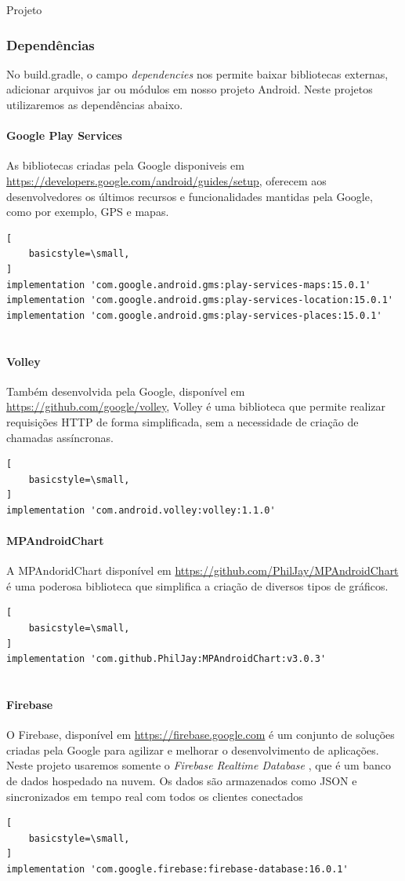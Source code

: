 \documentclass[
	12pt,				%
	openright,			%
	twoside,			%
	a4paper,			%
	english,			%
	french,				%
	spanish,			%
	brazil				%
	]{abntex2}
\begin{document}
\begin{chapter}{Projeto}
\subsubsection{Dependências}
 No build.gradle, o campo \textit{dependencies} nos permite baixar bibliotecas externas, adicionar arquivos jar ou módulos em nosso projeto Android. Neste projetos utilizaremos as dependências abaixo.
 
   \paragraph{Google Play Services}
   As bibliotecas criadas pela Google disponiveis em \url{https://developers.google.com/android/guides/setup}, oferecem aos desenvolvedores os últimos recursos e funcionalidades mantidas pela Google, como por exemplo, GPS e mapas.
       \begin{lstlisting}[
    basicstyle=\small,
] 
implementation 'com.google.android.gms:play-services-maps:15.0.1'
implementation 'com.google.android.gms:play-services-location:15.0.1'
implementation 'com.google.android.gms:play-services-places:15.0.1'
  
\end{lstlisting}

   \paragraph{Volley}
   Também desenvolvida pela Google, disponível em \url{https://github.com/google/volley}, Volley é uma biblioteca que permite realizar requisições HTTP de forma simplificada, sem a necessidade de criação de chamadas assíncronas.
       \begin{lstlisting}[
    basicstyle=\small,
]
implementation 'com.android.volley:volley:1.1.0'  
\end{lstlisting}

   \paragraph{MPAndroidChart}
   A  MPAndoridChart disponível em \url{https://github.com/PhilJay/MPAndroidChart} é uma poderosa biblioteca que simplifica a criação de diversos tipos de gráficos. 
        \begin{lstlisting}[
    basicstyle=\small,
] 
implementation 'com.github.PhilJay:MPAndroidChart:v3.0.3'
  
\end{lstlisting}
   \paragraph{Firebase}
O Firebase, disponível em \url{https://firebase.google.com} é um conjunto de soluções criadas pela Google para agilizar e melhorar o desenvolvimento de aplicações. Neste projeto usaremos somente o \textit{Firebase Realtime Database} , que é um banco de dados hospedado na nuvem. Os dados são armazenados como JSON e sincronizados em tempo real com todos os clientes conectados
        \begin{lstlisting}[
    basicstyle=\small,
]
implementation 'com.google.firebase:firebase-database:16.0.1'
  

\end{lstlisting}
\end{chapter}
\end{document}

